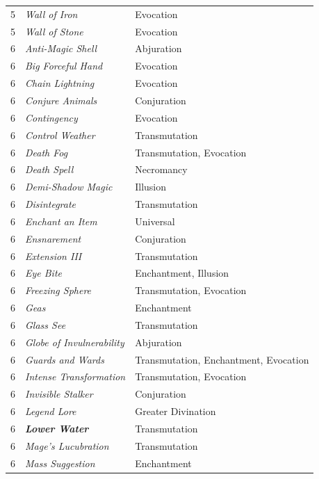 \begin{multicols}{2}
\begin{tabular}{|p{}|p{}|p{}|}
\rowcolor[gray]{.9}5	& \textit{Wall of Iron}	& Evocation \\
5	& \textit{Wall of Stone}	& Evocation \\
\rowcolor[gray]{.9}6	& \textit{Anti-Magic Shell}	& Abjuration \\
6	& \textit{Big Forceful Hand}	& Evocation \\
\rowcolor[gray]{.9}6	& \textit{Chain Lightning}	& Evocation \\
6	& \textit{Conjure Animals}	& Conjuration \\
\rowcolor[gray]{.9}6	& \textit{Contingency}	& Evocation \\
6	& \textit{Control Weather}	& Transmutation \\
\rowcolor[gray]{.9}6	& \textit{Death Fog}	& Transmutation, Evocation \\
6	& \textit{Death Spell}	& Necromancy \\
\rowcolor[gray]{.9}6	& \textit{Demi-Shadow Magic}	& Illusion \\
6	& \textit{Disintegrate}	& Transmutation \\
\rowcolor[gray]{.9}6	& \textit{Enchant an Item}	& Universal \\
6	& \textit{Ensnarement}	& Conjuration \\
\rowcolor[gray]{.9}6	& \textit{Extension III}	& Transmutation \\
6	& \textit{Eye Bite}	& Enchantment, Illusion \\
\rowcolor[gray]{.9}6	& \textit{Freezing Sphere}	& Transmutation, Evocation \\
6	& \textit{Geas}	& Enchantment \\
\rowcolor[gray]{.9}6	& \textit{Glass See}	& Transmutation \\
6	& \textit{Globe of Invulnerability}	& Abjuration \\
\rowcolor[gray]{.9}6	& \textit{Guards and Wards}	& Transmutation, Enchantment, Evocation \\
6	& \textit{Intense Transformation}	& Transmutation, Evocation \\
\rowcolor[gray]{.9}6	& \textit{Invisible Stalker}	& Conjuration \\
6	& \textit{Legend Lore}	& Greater Divination \\
\rowcolor[gray]{.9}6	& \textbf{\textit{Lower Water}}	& Transmutation \\
6	& \textit{Mage's Lucubration}	& Transmutation \\
\rowcolor[gray]{.9}6	& \textit{Mass Suggestion}	& Enchantment \\

\end{tabular}
\end{multicols}
